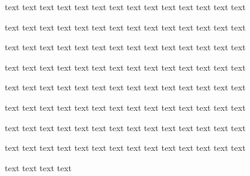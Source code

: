 \documentclass[12pt,a4paper,x11names,usenames,dvipsnames,svgnames,oneside]{book}
\begin{document}
	\begin{df}
		text text text text text text text text text text text text text text
		
		 text text text text text text text text text text text text text text
		 
		  text text text text text text text text text text text text text text
		  
		   text text text text text text text text text text text text text text 
		   
		   text text text text text text text text text text text text text text 
		   
		   text text text text text text text text text text text text text text 
		   
		   text text text text text text text text text text text text text text 
		   
		   text text text text text text text text text text text text text text 
		   
		   text text text text
	\end{df}
	
\end{document}
